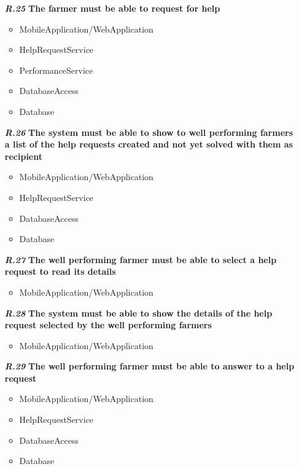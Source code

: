 \begin{itemize}
\item [\textbf{\textit{R.25}}]\textbf{ The farmer must be able to request for help}
\begin{itemize}
     \item MobileApplication/WebApplication
     \item HelpRequestService
     \item PerformanceService
     \item DatabaseAccess
     \item Database
\end{itemize} 

\item [\textbf{\textit{R.26}}] \textbf{The system must be able to show to well performing farmers a list of the help requests created and not yet solved with them as recipient}
\begin{itemize}
     \item MobileApplication/WebApplication
     \item HelpRequestService
     \item DatabaseAccess
     \item Database
\end{itemize} 

\item [\textbf{\textit{R.27}}] \textbf{The well performing farmer must be able to select a help request to read its details}
\begin{itemize}
     \item MobileApplication/WebApplication
\end{itemize} 

\item [\textbf{\textit{R.28}}] \textbf{The system must be able to show the details of the help request selected by the well performing farmers}
\begin{itemize}
     \item MobileApplication/WebApplication
\end{itemize} 

\item [\textbf{\textit{R.29}}] \textbf{The well performing farmer must be able to answer to a help request}
\begin{itemize}
     \item MobileApplication/WebApplication
     \item HelpRequestService
     \item DatabaseAccess
     \item Database
\end{itemize} 


\end{itemize}
